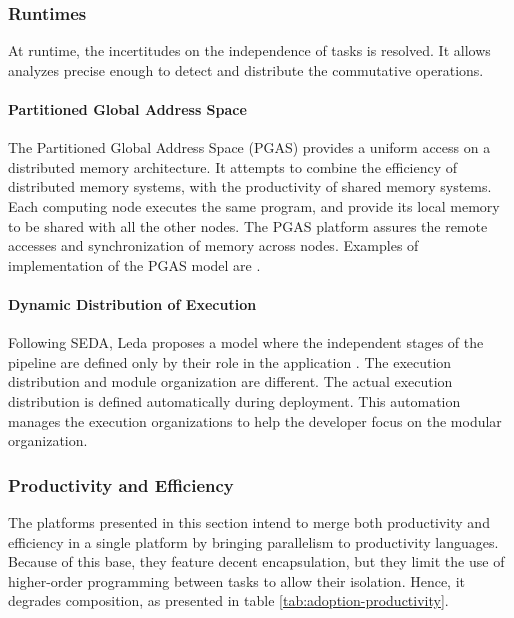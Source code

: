 \subsubsection{Runtimes} \label{chapter3:software-adoption:runtimes}

At runtime, the incertitudes on the independence of tasks is resolved.
It allows analyzes precise enough to detect and distribute the commutative operations.

\paragraph{Partitioned Global Address Space}

The Partitioned Global Address Space (PGAS) provides a uniform access on a distributed memory architecture.
It attempts to combine the efficiency of distributed memory systems, with the productivity of shared memory systems.
Each computing node executes the same program, and provide its local memory to be shared with all the other nodes.
The PGAS platform assures the remote accesses and synchronization of memory across nodes.
Examples of implementation of the PGAS model are .

\paragraph{Dynamic Distribution of Execution}

Following SEDA, Leda proposes a model where the independent stages of the pipeline are defined only by their role in the application \cite{Salmito2013,Salmito2014}.
The execution distribution and module organization are different.
The actual execution distribution is defined automatically during deployment.
This automation manages the execution organizations to help the developer focus on the modular organization.

\subsubsection{Productivity and Efficiency}

The platforms presented in this section intend to merge both productivity and efficiency in a single platform by bringing parallelism to productivity languages.
Because of this base, they feature decent encapsulation, but they limit the use of higher-order programming between tasks to allow their isolation.
Hence, it degrades composition, as presented in table \ref{tab:adoption-productivity}.

